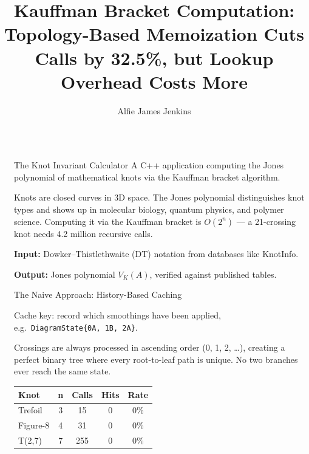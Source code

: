 \documentclass[final]{beamer}
\title{Kauffman Bracket Computation: Topology-Based Memoization Cuts Calls by 32.5\%, but Lookup Overhead Costs More}
\author{Alfie James Jenkins}
\institute[shortinst]{Falmouth University -- COMP203 Optimization}
\newlength{\sepwidth}
\newlength{\colwidth}
\newcommand{\separatorcolumn}{\begin{column}{\sepwidth}\end{column}}
\begin{document}
\begin{frame}[t,fragile]
\begin{columns}[t]
\separatorcolumn

\begin{column}{\colwidth}

  \begin{block}{The Knot Invariant Calculator}
    A C++ application computing the Jones polynomial of mathematical knots via the Kauffman bracket algorithm.
    
    \vspace{0.15cm}
    Knots are closed curves in 3D space. The Jones polynomial distinguishes knot types and shows up in molecular biology, quantum physics, and polymer science. Computing it via the Kauffman bracket is $O(2^n)$ --- a 21-crossing knot needs 4.2 million recursive calls.

    \vspace{0.15cm}
    \textbf{Input:} Dowker--Thistlethwaite (DT) notation from databases like KnotInfo.
    
    \textbf{Output:} Jones polynomial $V_K(A)$, verified against published tables.
  \end{block}

  \begin{alertblock}{The Naive Approach: History-Based Caching}
    
    Cache key: record which smoothings have been applied, e.g.\ \texttt{DiagramState\{0{\to}A,\ 1{\to}B,\ 2{\to}A\}}.

    \vspace{0.1cm}
    Crossings are always processed in ascending order (0, 1, 2, \ldots), creating a perfect binary tree where every root-to-leaf path is unique. No two branches ever reach the same state.

    \vspace{0.1cm}
    \begin{center}
    \begin{tabular}{lcccc}
    \toprule
    \textbf{Knot} & \textbf{n} & \textbf{Calls} & \textbf{Hits} & \textbf{Rate} \\
    \midrule
    Trefoil   & 3 &  15 & 0 & 0\% \\
    Figure-8  & 4 &  31 & 0 & 0\% \\
    T(2,7)    & 7 & 255 & 0 & 0\% \\
    \bottomrule
    \end{tabular}
    \end{center}


\end{alertblock}
\end{column}
\end{columns}
\end{frame}
\end{document}
